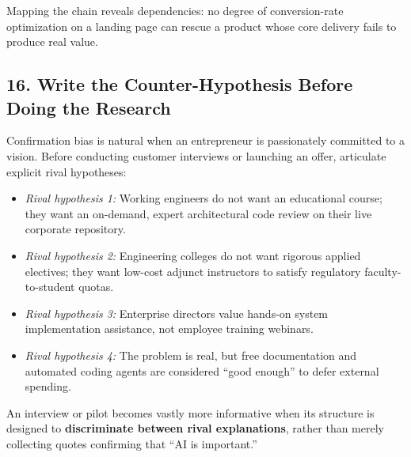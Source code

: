 Mapping the chain reveals dependencies: no degree of conversion-rate optimization on a landing page can rescue a product whose core delivery fails to produce real value.

\subsection*{16. Write the Counter-Hypothesis Before Doing the Research}

Confirmation bias is natural when an entrepreneur is passionately committed to a vision. Before conducting customer interviews or launching an offer, articulate explicit rival hypotheses:
\begin{itemize}
    \item \emph{Rival hypothesis 1:} Working engineers do not want an educational course; they want an on-demand, expert architectural code review on their live corporate repository.
    \item \emph{Rival hypothesis 2:} Engineering colleges do not want rigorous applied electives; they want low-cost adjunct instructors to satisfy regulatory faculty-to-student quotas.
    \item \emph{Rival hypothesis 3:} Enterprise directors value hands-on system implementation assistance, not employee training webinars.
    \item \emph{Rival hypothesis 4:} The problem is real, but free documentation and automated coding agents are considered ``good enough'' to defer external spending.
\end{itemize}

An interview or pilot becomes vastly more informative when its structure is designed to \textbf{discriminate between rival explanations}, rather than merely collecting quotes confirming that ``AI is important.''
